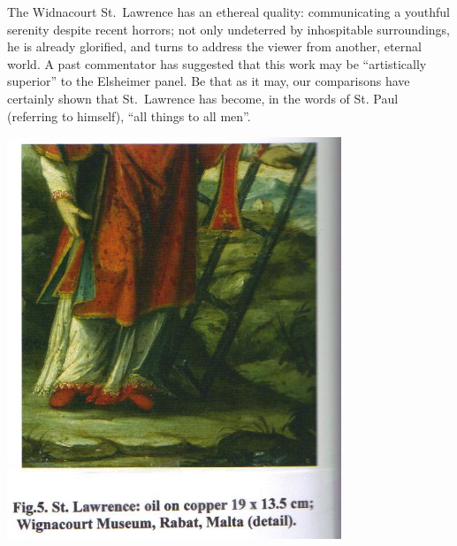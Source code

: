\documentclass[a4paper,12pt]{article}
\begin{document}
The Widnacourt St.~Lawrence has an ethereal quality: communicating a
youthful serenity despite recent horrors; not only undeterred by
inhospitable surroundings, he is already glorified, and turns to
address the viewer from another, eternal world.  A past commentator
has suggested that this work may be ``artistically superior'' to the
Elsheimer panel. Be that as it may, our comparisons have certainly
shown that St.~Lawrence has become, in the words of St. Paul
(referring to himself), ``all things to all men''.
\begin{center}
\includegraphics[width=10cm]{fig5.jpg}
\end{center}
\end{document}
